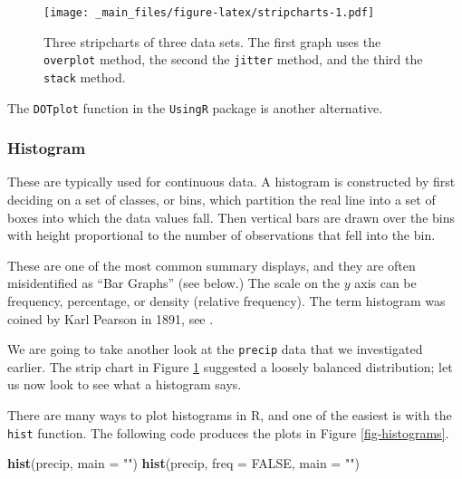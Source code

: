 \documentclass[]{book}
\newenvironment{Shaded}{\begin{snugshade}}{\end{snugshade}}
\newcommand{\KeywordTok}[1]{\textcolor[rgb]{0.13,0.29,0.53}{\textbf{{#1}}}}
\newcommand{\DataTypeTok}[1]{\textcolor[rgb]{0.13,0.29,0.53}{{#1}}}
\newcommand{\StringTok}[1]{\textcolor[rgb]{0.31,0.60,0.02}{{#1}}}
\newcommand{\OtherTok}[1]{\textcolor[rgb]{0.56,0.35,0.01}{{#1}}}
\newcommand{\NormalTok}[1]{{#1}}
\numberwithin{equation}{chapter}
\numberwithin{figure}{chapter}
\theoremstyle{plain}
\theoremstyle{definition}
\theoremstyle{remark}
\theoremstyle{definition}
\theoremstyle{definition}
\theoremstyle{remark}
\let\BeginKnitrBlock\begin \let\EndKnitrBlock\end
\begin{document}
\begin{figure}[htbp]
\centering
\texttt{[image: \_main\_files/figure-latex/stripcharts-1.pdf]}
\caption{\label{fig:stripcharts}\small Three stripcharts of three data sets. The
first graph uses the \texttt{overplot} method, the second the
\texttt{jitter} method, and the third the \texttt{stack} method.}
\end{figure}





The \texttt{DOTplot}  function in the
\texttt{UsingR}  package
\autocite{UsingR} is another alternative.

\subsubsection{\texorpdfstring{Histogram
}{Histogram }}\label{histogram}

These are typically used for continuous data. A histogram is constructed
by first deciding on a set of classes, or bins, which partition the real
line into a set of boxes into which the data values fall. Then vertical
bars are drawn over the bins with height proportional to the number of
observations that fell into the bin.

These are one of the most common summary displays, and they are often
misidentified as ``Bar Graphs'' (see below.) The scale on the \(y\) axis
can be frequency, percentage, or density (relative frequency). The term
histogram was coined by Karl Pearson in 1891, see \autocite{Miller}.

\bigskip

\BeginKnitrBlock{example}[Annual Precipitation in US Cities]
\protect\hypertarget{ex:annual}{}{\label{ex:annual} \iffalse (Annual
Precipitation in US Cities) \fi }We are going to take another look at
the \texttt{precip}  data that
we investigated earlier. The strip chart in Figure \ref{fig:stripcharts}
suggested a loosely balanced distribution; let us now look to see what a
histogram says.
\EndKnitrBlock{example}

There are many ways to plot histograms in R, and one of the easiest is
with the \texttt{hist}  function. The
following code produces the plots in Figure \ref{fig-histograms}.

\begin{Shaded}
\begin{Highlighting}[]
\KeywordTok{hist}\NormalTok{(precip, }\DataTypeTok{main =} \StringTok{""}\NormalTok{)}
\KeywordTok{hist}\NormalTok{(precip, }\DataTypeTok{freq =} \OtherTok{FALSE}\NormalTok{, }\DataTypeTok{main =} \StringTok{""}\NormalTok{)}
\end{Highlighting}
\end{Shaded}
\end{document}
